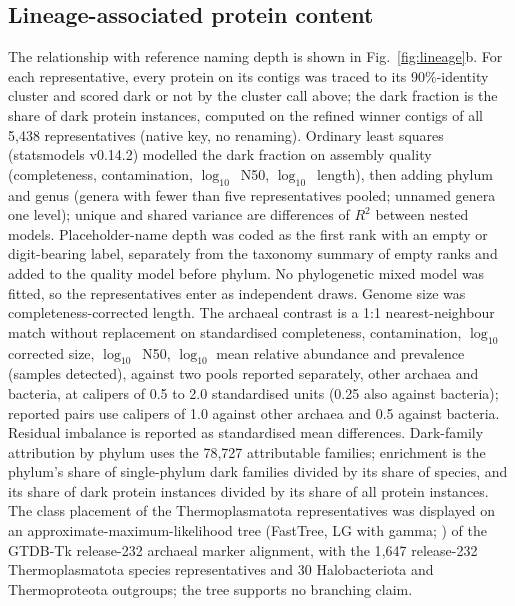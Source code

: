\subsection*{Lineage-associated protein content}
The relationship with reference naming depth is shown in Fig.~\ref{fig:lineage}b. For each representative, every protein on its contigs was traced to its 90\%-identity cluster and
scored dark or not by the cluster call above; the dark fraction is the share of dark protein
instances, computed on the refined winner contigs of all 5{,}438 representatives (native key, no
renaming). Ordinary least squares (statsmodels v0.14.2) modelled the dark fraction on assembly quality
(completeness, contamination, $\log_{10}$~N50, $\log_{10}$~length), then adding phylum and genus
(genera with fewer than five representatives pooled; unnamed genera one level); unique and shared
variance are differences of $R^2$ between nested models. Placeholder-name depth was coded as the first rank with an empty or digit-bearing label, separately from the taxonomy summary of empty ranks and added to the quality model before phylum. No
phylogenetic mixed model was fitted, so the representatives enter as independent draws. Genome size
was completeness-corrected length. The archaeal contrast is a 1:1 nearest-neighbour match without
replacement on standardised completeness, contamination, $\log_{10}$ corrected size,
$\log_{10}$~N50, $\log_{10}$ mean relative abundance and prevalence (samples detected), against two
pools reported separately, other archaea and bacteria, at calipers of 0.5 to 2.0 standardised units
(0.25 also against bacteria); reported pairs use calipers of 1.0 against other archaea and 0.5 against bacteria. Residual imbalance is reported as standardised mean differences. Dark-family attribution by
phylum uses the 78{,}727 attributable families; enrichment is the phylum's share of single-phylum
dark families divided by its share of species, and its share of dark protein instances divided by
its share of all protein instances. The class placement of the Thermoplasmatota representatives was
displayed on an approximate-maximum-likelihood tree (FastTree, LG with gamma; \citep{price2010fasttree}) of the GTDB-Tk
release-232 archaeal marker alignment, with the 1{,}647 release-232 Thermoplasmatota species
representatives and 30 Halobacteriota and Thermoproteota outgroups; the tree supports no branching
claim.

